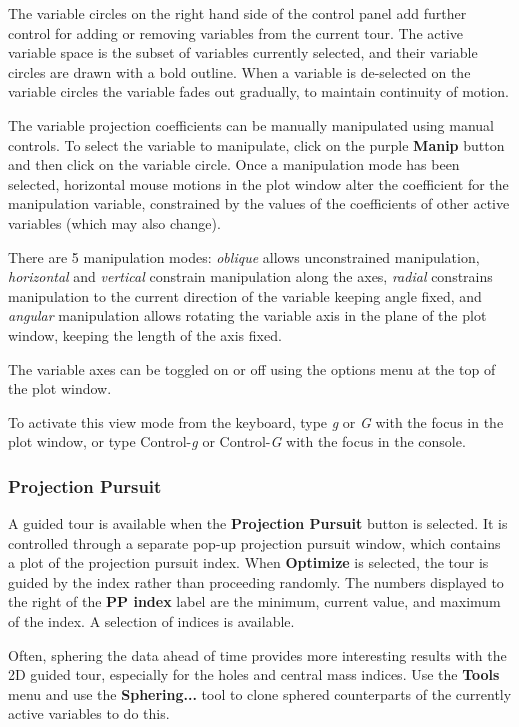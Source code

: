 \documentclass[11pt]{article}
\begin{document}
The variable circles on the right hand side of the control panel add
further control for adding or removing variables from the current
tour. The active variable space is the subset of variables currently
selected, and their variable circles are drawn with a bold
outline. When a variable is de-selected on the variable circles the
variable fades out gradually, to maintain continuity of motion.

The variable projection coefficients can be manually manipulated using
manual controls. To select the variable to manipulate, click on the
purple {\bf Manip} button and then click on the variable circle. 
Once a manipulation mode has been selected,
horizontal mouse motions in the plot window alter the coefficient for
the manipulation variable, constrained by the values of the coefficients
of other active variables (which may also change).

There are 5 manipulation modes: {\it oblique} allows unconstrained
manipulation, {\it horizontal} and {\it vertical} constrain manipulation
along the axes, {\it radial} constrains manipulation to the current
direction of the variable keeping angle fixed, and {\it angular}
manipulation allows rotating the variable axis in the plane of the plot
window, keeping the length of the axis fixed.

The variable axes can be toggled on or off using the options menu at
the top of the plot window.

To activate this view mode from the keyboard, type {\em g} or {\em G}
with the focus in the plot window, or type Control-{\em g} or
Control-{\em G} with the focus in the console.

\subsubsection{Projection Pursuit}

A guided tour is available when the {\bf Projection Pursuit} button is
selected. It is controlled through a separate pop-up projection
pursuit window, which contains a plot of the projection pursuit index.
When {\bf Optimize} is selected, the tour is guided by the index
rather than proceeding randomly.  The numbers displayed to the right
of the {\bf PP index} label are the minimum, current value, and
maximum of the index.  A selection of indices is available.

Often, sphering the data ahead of time provides more interesting
results with the 2D guided tour, especially for the holes and central
mass indices. Use the {\bf Tools} menu and use the {\bf Sphering...}
tool to clone sphered counterparts of the currently active variables
to do this.
\end{document}
